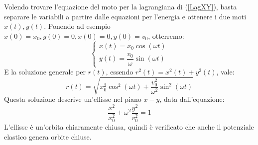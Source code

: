 \documentclass[a4paper,openany]{article}
\begin{document}
	Volendo trovare l'equazione del moto per la lagrangiana di (\ref{LagXY}), basta separare le variabili a partire dalle equazioni per l'energia e ottenere i due moti $x(t), y(t)$. Ponendo ad esempio $x(0)=x_{0}, y(0) = 0, \dot{x}(0) = 0, \dot{y}(0) = v_{0}$, otterremo:
	\begin{equation}
		\begin{cases}
			x(t) = x_{0}\cos(\omega t) \\
			y(t) = \dfrac{v_{0}}{\omega}\sin(\omega t)
		\end{cases}
	\end{equation}
	E la soluzione generale per $r(t)$, essendo $r^{2}(t) = x^{2}(t) + y^{2}(t)$, vale:
	$$
	r(t) = \sqrt{x_{0}^{2}\cos^{2}(\omega t) + \dfrac{v_{0}^{2}}{\omega^{2}}\sin^{2}(\omega t)}
	$$
	Questa soluzione descrive un'ellisse nel piano $x-y$, data dall'equazione:
	$$
	\dfrac{x^{2}}{x_{0}^{2}} + \omega^{2}\dfrac{y^{2}}{v_{0}^{2}} = 1
	$$
	L'ellisse è un'orbita chiaramente chiusa, quindi è verificato che anche il potenziale elastico genera orbite chiuse.
\end{document}
